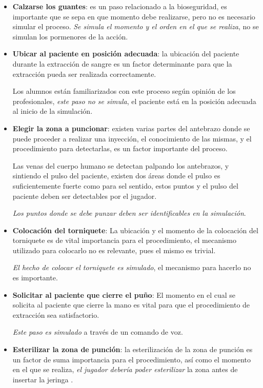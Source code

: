 \begin{itemize}
\item \textbf{Calzarse los guantes}: es un paso relacionado a la bioseguridad,
    es importante que se sepa en que momento debe realizarse, pero no es
    necesario simular el proceso. 
    \emph{Se simula el momento y el orden en el que se realiza}, no se simulan
    los pormenores de la acción.

\item \textbf{Ubicar al paciente en posición adecuada}: la ubicación del
    paciente durante la extracción de sangre es un factor determinante para que
    la extracción pueda ser realizada correctamente.

    Los alumnos están familiarizados con este proceso según opinión de los
    profesionales, \emph{este paso no se simula}, el paciente está en la
    posición adecuada al inicio de la simulación.

\item \textbf{Elegir la zona a puncionar}: existen varias partes del antebrazo
    donde se puede proceder a realizar una inyección, el conocimiento de las
    mismas, y el procedimiento para detectarlas, es un factor importante del
    proceso.
    
    Las venas del cuerpo humano se detectan palpando los antebrazos, y sintiendo
    el pulso del paciente, existen dos áreas donde el pulso es suficientemente
    fuerte como para sel sentido, estos puntos y el pulso del paciente deben ser
    detectables por el jugador.

    \emph{Los puntos donde se debe punzar deben ser identificables en la
        simulación}. 

\item \textbf{Colocación del torniquete}: La ubicación y el momento de la
    colocación del torniquete es de vital importancia para el procedimiento, el
    mecanismo utilizado para colocarlo no es relevante, pues el mismo es
    trivial.

    \emph{El hecho de colocar el torniquete es simulado}, el mecanismo para
    hacerlo no es importante.

\item \textbf{Solicitar al paciente que cierre el puño}: El momento en el cual
    se solicita al paciente que cierre la mano es vital para que el
    procedimiento de extracción sea satisfactorio.

    \emph{Este paso es simulado} a través de un comando de voz.

\item \textbf{Esterilizar la zona de punción}: la esterilización de la zona de
    punción es un factor de suma importancia para el procedimiento, así como el
    momento en el que se realiza, \emph{el jugador debería poder esterilizar} la
    zona antes de insertar la jeringa .
    

\end{itemize}
